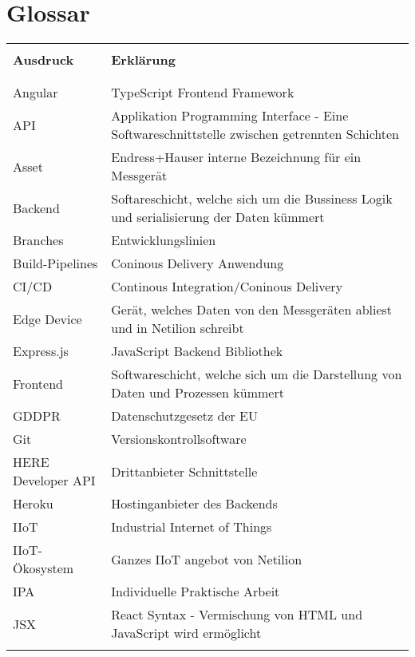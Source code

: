 \chapter{Glossar}
\begin{table}[H]
  \begin{tabularx}{\textwidth}{l X}\hline \\
  \textbf{Ausdruck} & \textbf{Erklärung}  \\ \\\hline \\
  Angular & TypeScript Frontend Framework \\
  API & Applikation Programming Interface - Eine Softwareschnittstelle zwischen getrennten Schichten \\
  Asset & Endress+Hauser interne Bezeichnung für ein Messgerät \\
  Backend & Softareschicht, welche sich um die Bussiness Logik und serialisierung der Daten kümmert \\
  Branches & Entwicklungslinien \\
  Build-Pipelines & Coninous Delivery Anwendung \\
  CI/CD & Continous Integration/Coninous Delivery \\
  Edge Device & Gerät, welches Daten von den Messgeräten abliest und in Netilion schreibt \\
  Express.js & JavaScript Backend Bibliothek \\
  Frontend & Softwareschicht, welche sich um die Darstellung von Daten und Prozessen kümmert \\
  GDDPR & Datenschutzgesetz der EU \\
  Git & Versionskontrollsoftware \\
  HERE Developer API & Drittanbieter Schnittstelle \\
  Heroku & Hostinganbieter des Backends \\
  IIoT & Industrial Internet of Things \\
  IIoT-Ökosystem & Ganzes IIoT angebot von Netilion \\
  IPA & Individuelle Praktische Arbeit \\
  JSX & React Syntax - Vermischung von HTML und JavaScript wird ermöglicht \\
  \\\hline
  \end{tabularx}
\end{table}
\pagebreak

